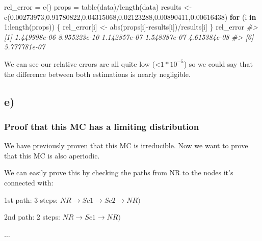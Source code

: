 \documentclass[
]{article}
\newenvironment{Shaded}{\begin{snugshade}}{\end{snugshade}}
\newcommand{\CommentTok}[1]{\textcolor[rgb]{0.56,0.35,0.01}{\textit{#1}}}
\newcommand{\ControlFlowTok}[1]{\textcolor[rgb]{0.13,0.29,0.53}{\textbf{#1}}}
\newcommand{\DecValTok}[1]{\textcolor[rgb]{0.00,0.00,0.81}{#1}}
\newcommand{\FloatTok}[1]{\textcolor[rgb]{0.00,0.00,0.81}{#1}}
\newcommand{\FunctionTok}[1]{\textcolor[rgb]{0.00,0.00,0.00}{#1}}
\newcommand{\NormalTok}[1]{#1}
\newcommand{\OtherTok}[1]{\textcolor[rgb]{0.56,0.35,0.01}{#1}}
\newcommand{\SpecialCharTok}[1]{\textcolor[rgb]{0.00,0.00,0.00}{#1}}
\begin{document}
\begin{Shaded}
\begin{Highlighting}[]
\NormalTok{rel\_error }\OtherTok{=} \FunctionTok{c}\NormalTok{()}
\NormalTok{props }\OtherTok{=} \FunctionTok{table}\NormalTok{(data)}\SpecialCharTok{/}\FunctionTok{length}\NormalTok{(data)}
\NormalTok{results }\OtherTok{\textless{}{-}} \FunctionTok{c}\NormalTok{(}\FloatTok{0.00273973}\NormalTok{,}\FloatTok{0.91780822}\NormalTok{,}\FloatTok{0.04315068}\NormalTok{,}\FloatTok{0.02123288}\NormalTok{,}\FloatTok{0.00890411}\NormalTok{,}\FloatTok{0.00616438}\NormalTok{)}
\ControlFlowTok{for}\NormalTok{ (i }\ControlFlowTok{in} \DecValTok{1}\SpecialCharTok{:}\FunctionTok{length}\NormalTok{(props)) \{}
\NormalTok{    rel\_error[i] }\OtherTok{\textless{}{-}} \FunctionTok{abs}\NormalTok{(props[i]}\SpecialCharTok{{-}}\NormalTok{results[i])}\SpecialCharTok{/}\NormalTok{results[i]}
\NormalTok{\}}
\NormalTok{rel\_error}
\CommentTok{\#\textgreater{} [1] 1.449998e{-}06 8.955223e{-}10 1.142857e{-}07 1.548387e{-}07 4.615384e{-}08}
\CommentTok{\#\textgreater{} [6] 5.777781e{-}07}
\end{Highlighting}
\end{Shaded}

We can see our relative errors are all quite low
(\textless{}\(1*10^{-5}\)) so we could say that the difference between
both estimations is nearly negligible.

\hypertarget{e}{%
\subsection{e)}\label{e}}

\hypertarget{proof-that-this-mc-has-a-limiting-distribution}{%
\subsubsection{Proof that this MC has a limiting
distribution}\label{proof-that-this-mc-has-a-limiting-distribution}}

We have previously proven that this MC is irreducible. Now we want to
prove that this MC is also aperiodic.

We can easily prove this by checking the paths from NR to the nodes it's
connected with:

1st path: 3 steps:
\(NR \rightarrow Sc1 \rightarrow Sc2 \rightarrow NR)\)

2nd path: 2 steps: \(NR \rightarrow Sc1 \rightarrow NR)\)

\(\dots\)
\end{document}
